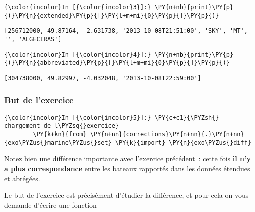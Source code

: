     \begin{Verbatim}[commandchars=\\\{\},frame=single,framerule=0.3mm,rulecolor=\color{cellframecolor}]
{\color{incolor}In [{\color{incolor}3}]:} \PY{n+nb}{print}\PY{p}{(}\PY{n}{extended}\PY{p}{[}\PY{l+m+mi}{0}\PY{p}{]}\PY{p}{)}
\end{Verbatim}


    \begin{Verbatim}[commandchars=\\\{\},frame=single,framerule=0.3mm,rulecolor=\color{cellframecolor}]
[256712000, 49.87164, -2.631738, '2013-10-08T21:51:00', 'SKY', 'MT', '', 'ALGECIRAS']
\end{Verbatim}

    \begin{Verbatim}[commandchars=\\\{\},frame=single,framerule=0.3mm,rulecolor=\color{cellframecolor}]
{\color{incolor}In [{\color{incolor}4}]:} \PY{n+nb}{print}\PY{p}{(}\PY{n}{abbreviated}\PY{p}{[}\PY{l+m+mi}{0}\PY{p}{]}\PY{p}{)}
\end{Verbatim}


    \begin{Verbatim}[commandchars=\\\{\},frame=single,framerule=0.3mm,rulecolor=\color{cellframecolor}]
[304738000, 49.82997, -4.032048, '2013-10-08T22:59:00']
\end{Verbatim}

    \hypertarget{but-de-lexercice}{%
\subsubsection{But de l'exercice}\label{but-de-lexercice}}

    \begin{Verbatim}[commandchars=\\\{\},frame=single,framerule=0.3mm,rulecolor=\color{cellframecolor}]
{\color{incolor}In [{\color{incolor}5}]:} \PY{c+c1}{\PYZsh{} chargement de l\PYZsq{}exercice}
        \PY{k+kn}{from} \PY{n+nn}{corrections}\PY{n+nn}{.}\PY{n+nn}{exo\PYZus{}marine\PYZus{}set} \PY{k}{import} \PY{n}{exo\PYZus{}diff}
\end{Verbatim}


    Notez bien une différence importante avec l'exercice précédent~: cette
fois \textbf{il n'y a plus correspondance} entre les bateaux rapportés
dans les données étendues et abrégées.

Le but de l'exercice est précisément d'étudier la différence, et pour
cela on vous demande d'écrire une fonction

